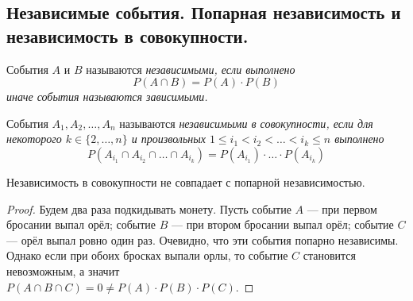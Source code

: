 \subsection{Независимые события. Попарная независимость и независимость в совокупности.}
\begin{definition}
    События $A$ и $B$ называются \it{независимыми}, если выполнено
    \[
        P(A \cap B) = P(A) \cdot P(B)
    \]
    иначе события называются \it{зависимыми}.
\end{definition}
\begin{definition}
    События $A_1, A_2, \ldots, A_n$ называются \it{независимыми в совокупности}, если
    для некоторого $k \in \{2, \ldots, n\}$ и произвольных $1 \leq i_1 < i_2 < \ldots < i_k \leq n$
    выполнено
    \[
        P(A_{i_1} \cap A_{i_2} \cap \ldots \cap A_{i_k}) =
        P(A_{i_1}) \cdot \ldots \cdot P(A_{i_k})
    \]
\end{definition}
\begin{proposal}
    Независимость в совокупности не совпадает с попарной независимостью.
\end{proposal}
\begin{proof}
    Будем два раза подкидывать монету. Пусть событие $A$ --- при первом бросании выпал орёл;
    событие $B$ --- при втором бросании выпал орёл; событие $C$ --- орёл выпал ровно один раз.
    Очевидно, что эти события попарно независимы. Однако если при обоих бросках выпали орлы, то
    событие $C$ становится невозможным, а значит\\ $P(A \cap B \cap C) = 0 \neq P(A) \cdot P(B)
    \cdot P(C)$.
\end{proof}

